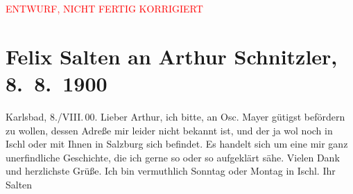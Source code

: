 
\begin{center}
            \textcolor{red}{ENTWURF, NICHT FERTIG KORRIGIERT}
                      \end{center}
            
         
         \renewcommand{\erwaehntePersonen}{Personen: Oskar Mayer}
         \renewcommand{\erwaehnteOrte}{Orte: Bad Ischl, Karlsbad, Salzburg}
         \renewcommand{\erwaehnteWerke}{}
               \section[Felix Salten an Arthur Schnitzler, 8. 8. 1900]{ Felix Salten an Arthur Schnitzler, 8. 8. 1900}\nopagebreak{}\rehead{ }\begin{ledgroupsized}[t]{13cm}\normalsize\beginnumbering \toendnotes[C]{\smallbreak\pagebreak[2]} 
\toendnotes[C]{\smallbreak}\pstart
           \raggedleft{}{\pb}Karlsbad, 8./VIII. 00.
               \pend
           \pstart
           Lieber Arthur, ich bitte, \label{K_L03309-1v}\label{K_L03309-1h} an Osc. Mayer gütigst befördern zu wollen, dessen Adreße mir
               leider nicht bekannt ist, und der ja wol noch in Ischl oder mit Ihnen in Salzburg sich
               befindet. Es handelt sich um eine mir ganz unerfindliche Geschichte, die ich gerne so
               oder so aufgeklärt sähe. \pend
           \pstart
           Vielen Dank und herzlichste Grüße. Ich bin vermuthlich Sonntag oder
                  Montag in Ischl. \pend
           \pstart Ihr \spacefill\mbox{Salten}\pend{}
         
         \endnumbering{}\end{ledgroupsized}\begin{anhang}\end{anhang}\newcommand{\dateiname}{L03309}\newcommand{\titel}{Felix Salten an Arthur Schnitzler, 8. 8. 1900}\newcommand{\editorInnen}{Martin Anton Müller und Laura Untner}
      